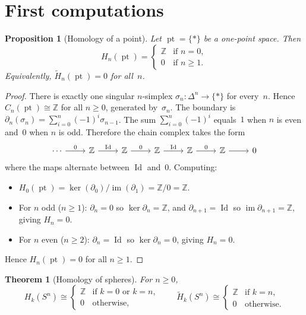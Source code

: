 \documentclass[12pt,a4paper,openany]{book}
\theoremstyle{definition}
\theoremstyle{plain}
\newtheorem{theorem}[definition]{Theorem}
\newtheorem{proposition}[definition]{Proposition}
\theoremstyle{remark}
\newcommand{\Z}{\mathbb{Z}}
\DeclareMathOperator{\im}{im}
\DeclareMathOperator{\Id}{Id}
\begin{document}
\section{First computations}\label{sec:first-computations}

\begin{proposition}[Homology of a point]\label{prop:homology-point}
Let $\operatorname{pt}=\{*\}$ be a one-point space.  Then
\[
  H_n(\operatorname{pt}) =
  \begin{cases}
    \Z & \text{if } n=0,\\
    0  & \text{if } n\ge 1.
  \end{cases}
\]
Equivalently, $\widetilde{H}_n(\operatorname{pt})=0$ for all~$n$.
\end{proposition}

\begin{proof}
There is exactly one singular $n$-simplex $\sigma_n\colon\Delta^n\to\{*\}$
for every~$n$.  Hence $C_n(\operatorname{pt})\cong\Z$ for all $n\ge 0$,
generated by~$\sigma_n$.
The boundary is $\partial_n(\sigma_n)=\sum_{i=0}^n(-1)^i\sigma_{n-1}$.
The sum $\sum_{i=0}^n(-1)^i$ equals~$1$ when $n$ is even and~$0$ when
$n$ is odd.  Therefore the chain complex takes the form
\[
\begin{tikzcd}
  \cdots \ar[r,"0"] & \Z \ar[r,"\Id"] & \Z \ar[r,"0"] & \Z \ar[r,"\Id"] & \Z \ar[r,"0"] & \Z \ar[r] & 0
\end{tikzcd}
\]
where the maps alternate between $\Id$ and~$0$.  Computing:
\begin{itemize}[leftmargin=2em]
  \item $H_0(\operatorname{pt})=\ker(\partial_0)/\im(\partial_1)=\Z/0=\Z$.
  \item For $n$ odd ($n\ge 1$): $\partial_n=0$ so $\ker\partial_n=\Z$,
    and $\partial_{n+1}=\Id$ so $\im\partial_{n+1}=\Z$, giving $H_n=0$.
  \item For $n$ even ($n\ge 2$): $\partial_n=\Id$ so $\ker\partial_n=0$,
    giving $H_n=0$.
\end{itemize}
Hence $H_n(\operatorname{pt})=0$ for all $n\ge 1$.
\end{proof}

\begin{theorem}[Homology of spheres]\label{thm:homology-spheres}
For $n\ge 0$,
\[
  H_k(S^n) \cong
  \begin{cases}
    \Z & \text{if } k=0 \text{ or } k=n,\\
    0  & \text{otherwise},
  \end{cases}
  \qquad
  \widetilde{H}_k(S^n) \cong
  \begin{cases}
    \Z & \text{if } k=n,\\
    0  & \text{otherwise}.
  \end{cases}
\]
\end{theorem}
\end{document}
